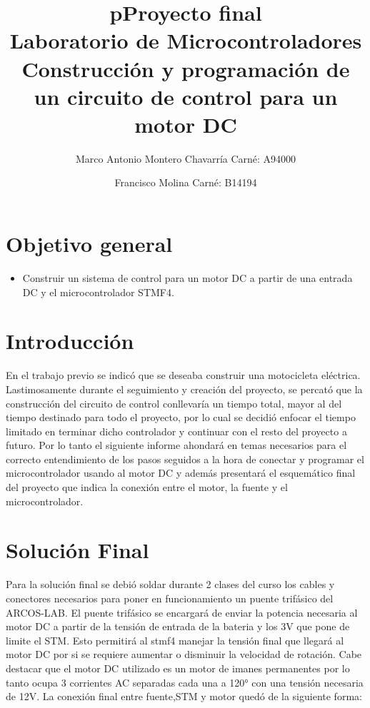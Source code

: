 \documentclass[letterpaper]{article}
\begin{document}
\title{pProyecto final\\ Laboratorio de Microcontroladores\\ Construcción y programación de un circuito de control para un motor DC}
\author{
 Marco Antonio Montero Chavarrí­a Carné: A94000\\
 \and
 Francisco Molina Carné: B14194}
\maketitle

\section{Objetivo general}
\begin{itemize}
\item Construir un sistema de control para un motor DC a partir de una entrada DC y el microcontrolador STMF4.
\end{itemize}

\section{Introducción}

En el trabajo previo se indicó que se deseaba construir una motocicleta eléctrica. Lastimosamente durante el seguimiento y creación del proyecto, se percató que la
construcción del circuito de control conllevaría un tiempo total, mayor al del tiempo destinado para todo el proyecto, por lo cual se decidió enfocar el tiempo limitado
en terminar dicho controlador y continuar con el resto del proyecto a futuro. 
Por lo tanto el siguiente informe ahondará en temas necesarios para el correcto entendimiento de los pasos seguidos 
a la hora de conectar y programar el microcontrolador usando al motor DC y además presentará el esquemático final del proyecto que indica la conexión entre 
el motor, la fuente y el microcontrolador.

\section{Solución Final}
Para la solución final se debió soldar durante 2 clases del curso los cables y conectores necesarios para poner en funcionamiento un puente trifásico del ARCOS-LAB. El puente
trifásico se encargará de enviar la potencia necesaria al motor DC a partir de la tensión de entrada de la bateria y los 3V que pone de limite el STM.
Esto permitirá al stmf4 manejar la tensión final que llegará al motor DC por si se requiere aumentar o disminuir la velocidad de rotación.
Cabe destacar que el motor DC utilizado es un motor de imanes permanentes por lo tanto ocupa 3 corrientes AC separadas cada una a 120° con una tensión necesaria de 12V. La conexión final entre fuente,STM y motor quedó de la siguiente forma:
 
\end{document}
